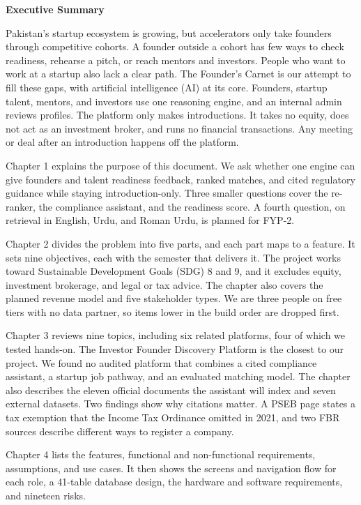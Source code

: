 \documentclass{FastFyp}
\newcommand{\fronthead}[1]{{\raggedright\normalfont\huge\bfseries #1\par\nobreak}\vskip 12pt}
\begin{document}
\fronthead{Executive Summary}
Pakistan's startup ecosystem is growing, but accelerators only take founders through competitive cohorts. A founder outside a cohort has few ways to check readiness, rehearse a pitch, or reach mentors and investors. People who want to work at a startup also lack a clear path. The Founder's Carnet is our attempt to fill these gaps, with artificial intelligence (AI) at its core. Founders, startup talent, mentors, and investors use one reasoning engine, and an internal admin reviews profiles. The platform only makes introductions. It takes no equity, does not act as an investment broker, and runs no financial transactions. Any meeting or deal after an introduction happens off the platform.

Chapter 1 explains the purpose of this document. We ask whether one engine can give founders and talent readiness feedback, ranked matches, and cited regulatory guidance while staying introduction-only. Three smaller questions cover the re-ranker, the compliance assistant, and the readiness score. A fourth question, on retrieval in English, Urdu, and Roman Urdu, is planned for FYP-2.

Chapter 2 divides the problem into five parts, and each part maps to a feature. It sets nine objectives, each with the semester that delivers it. The project works toward Sustainable Development Goals (SDG) 8 and 9, and it excludes equity, investment brokerage, and legal or tax advice. The chapter also covers the planned revenue model and five stakeholder types. We are three people on free tiers with no data partner, so items lower in the build order are dropped first.

Chapter 3 reviews nine topics, including six related platforms, four of which we tested hands-on. The Investor Founder Discovery Platform is the closest to our project. We found no audited platform that combines a cited compliance assistant, a startup job pathway, and an evaluated matching model. The chapter also describes the eleven official documents the assistant will index and seven external datasets. Two findings show why citations matter. A PSEB page states a tax exemption that the Income Tax Ordinance omitted in 2021, and two FBR sources describe different ways to register a company.

Chapter 4 lists the features, functional and non-functional requirements, assumptions, and use cases. It then shows the screens and navigation flow for each role, a 41-table database design, the hardware and software requirements, and nineteen risks.
\end{document}
